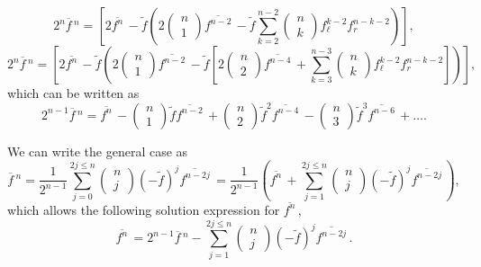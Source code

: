\documentclass[10pt]{article}
\newcommand{\avg}[1]{\overline{#1}\,}
\newcommand{\invavg}[1]{\widetilde{#1}}
\begin{document}
\begin{equation}
	2^n\avg{f}^n = \left[2\avg{f^n} - \invavg{f}\left(2\begin{pmatrix}n \\ 1\end{pmatrix}\avg{f^{n-2}} - \invavg{f}\sum_{k=2}^{n-2}\begin{pmatrix}n \\ k\end{pmatrix}f_\ell^{k-2}f_r^{n-k-2}\right)\right],
\end{equation}
\begin{equation}
	2^n\avg{f}^n = \left[2\avg{f^n} - \invavg{f}\left(2\begin{pmatrix}n \\ 1\end{pmatrix}\avg{f^{n-2}} - \invavg{f}\left[2\begin{pmatrix}n \\ 2\end{pmatrix}\avg{f^{n-4}} + \sum_{k=3}^{n-3}\begin{pmatrix}n \\ k\end{pmatrix}f_\ell^{k-2}f_r^{n-k-2}\right]\right)\right],
\end{equation}
which can be written as
\begin{equation}
	2^{n-1}\avg{f}^n = \avg{f^n} - \begin{pmatrix}n \\ 1\end{pmatrix}\invavg{f}\avg{f^{n-2}} + \begin{pmatrix}n \\ 2\end{pmatrix}\invavg{f}^2\avg{f^{n-4}} - \begin{pmatrix}n \\ 3\end{pmatrix}\invavg{f}^3\avg{f^{n-6}} + \ldots .
\end{equation}

We can write the general case as
\begin{equation}
	\avg{f}^n = \frac{1}{2^{n-1}}\sum_{j=0}^{2j\leq n}\begin{pmatrix}n \\ j\end{pmatrix}\left(-\invavg{f}\right)^j\avg{f^{n-2j}} = \frac{1}{2^{n-1}}\left(\avg{f^n} + \sum_{j=1}^{2j\leq n}\begin{pmatrix}n \\ j\end{pmatrix}\left(-\invavg{f}\right)^j\avg{f^{n-2j}}\right),
\end{equation}
which allows the following solution expression for $\avg{f^n}$, 
\begin{equation}
	\avg{f^n} = 2^{n-1}\avg{f}^n - \sum_{j=1}^{2j\leq n}\begin{pmatrix}n \\ j\end{pmatrix}\left(-\invavg{f}\right)^j\avg{f^{n-2j}}.
\end{equation}
\end{document}
